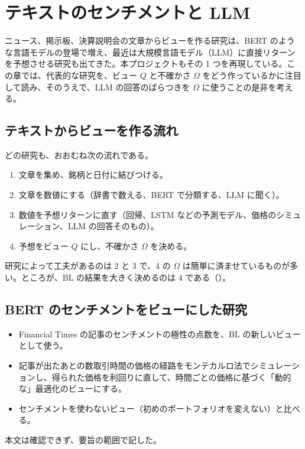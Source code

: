 \chapter{テキストのセンチメントと LLM}\label{ch:text}

ニュース、掲示板、決算説明会の文章からビューを作る研究は、BERT のような言語モデルの登場で増え、最近は大規模言語モデル（LLM）に直接リターンを予想させる研究も出てきた。本プロジェクトもその 1 つを再現している。この章では、代表的な研究を、ビュー $Q$ と不確かさ $\Omega$ をどう作っているかに注目して読み、そのうえで、LLM の回答のばらつきを $\Omega$ に使うことの是非を考える。

\section{テキストからビューを作る流れ}

どの研究も、おおむね次の流れである。

\begin{enumerate}
\item 文章を集め、銘柄と日付に結びつける。
\item 文章を数値にする（辞書で数える、BERT で分類する、LLM に聞く）。
\item 数値を予想リターンに直す（回帰、LSTM などの予測モデル、価格のシミュレーション、LLM の回答そのもの）。
\item 予想をビュー $Q$ にし、不確かさ $\Omega$ を決める。
\end{enumerate}

研究によって工夫があるのは 2 と 3 で、4 の $\Omega$ は簡単に済ませているものが多い。ところが、BL の結果を大きく決めるのは 4 である（）。

\section{BERT のセンチメントをビューにした研究}

\begin{paperbox}
\begin{itemize}
\item Financial Times の記事のセンチメントの極性の点数を、BL の新しいビューとして使う。
\item 記事が出たあとの数取引時間の価格の経路をモンテカルロ法でシミュレーションし、得られた価格を利回りに直して、時間ごとの価格に基づく「動的な」最適化のビューにする。
\item センチメントを使わないビュー（初めのポートフォリオを変えない）と比べる。
\end{itemize}
本文は確認できず、要旨の範囲で記した。
\end{paperbox}


